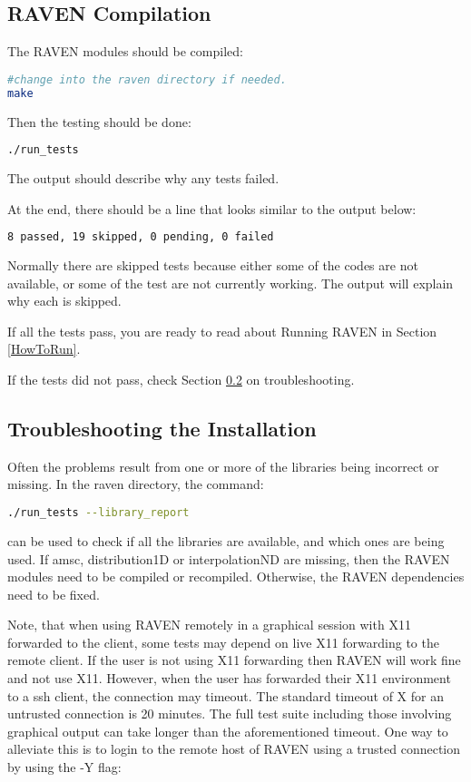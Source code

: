 \subsection{RAVEN Compilation}
\label{raven_compilation}

The RAVEN modules should be compiled:

\begin{lstlisting}[language=bash]
#change into the raven directory if needed.
make
\end{lstlisting}

Then the testing should be done:

\begin{lstlisting}[language=bash]
./run_tests
\end{lstlisting}

The output should describe why any tests failed.

At the end, there should be a line that looks similar to the output below:
\begin{lstlisting}[language=bash]
8 passed, 19 skipped, 0 pending, 0 failed
\end{lstlisting}

Normally there are skipped tests because either some of the codes are
not available, or some of the test are not currently working.  The
output will explain why each is skipped.

If all the tests pass, you are ready to read about Running RAVEN in
Section \ref{HowToRun}.

If the tests did not pass, check Section
\ref{troubleshooting_installation} on troubleshooting.

\subsection{Troubleshooting the Installation}
\label{troubleshooting_installation}

Often the problems result from one or more of the libraries being
incorrect or missing.  In the raven directory, the command:

\begin{lstlisting}[language=bash]
./run_tests --library_report
\end{lstlisting}
can be used to check if all the libraries are available, and which
ones are being used.  If amsc, distribution1D or interpolationND are
missing, then the RAVEN modules need to be compiled or recompiled.
Otherwise, the RAVEN dependencies need to be fixed.

Note, that when using RAVEN remotely in a graphical session with X11
forwarded to the client, some tests may depend on live X11 forwarding
to the remote client. If the user is not using X11 forwarding then
RAVEN will work fine and not use X11.  However, when the user has
forwarded their X11 environment to a ssh client, the connection may
timeout. The standard timeout of X for an untrusted connection is 20
minutes.  The full test suite including those involving graphical
output can take longer than the aforementioned timeout. One way to
alleviate this is to login to the remote host of RAVEN using a trusted
connection by using the -Y flag:

